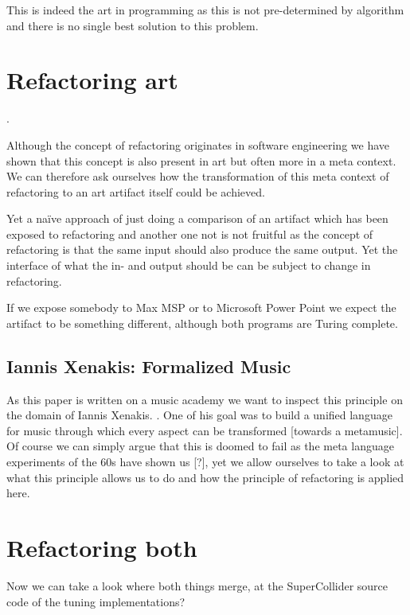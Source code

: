 \documentclass[10pt,twocolumn,letterpaper]{article}
\begin{document}
This is indeed the art in programming as this is not pre-determined by algorithm and there is no
single best solution to this problem.

\section{Refactoring art}

\cite{Schubert_2019}.

Although the concept of refactoring originates in software engineering we have shown that this concept is also
present in art but often more in a meta context.
We can therefore ask ourselves how the transformation of this meta context of refactoring to an art artifact itself
could be achieved.

Yet a naïve approach of just doing a comparison of an artifact which has been exposed to refactoring and another one
not is not fruitful as the concept of refactoring is that the same input should also produce the same output.
Yet the interface of what the in- and output should be can be subject to change in refactoring.

If we expose somebody to Max MSP or to Microsoft Power Point we expect the artifact to be something different, although
both programs are Turing complete.

\subsection{Iannis Xenakis: Formalized Music}

As this paper is written on a music academy we want to inspect this principle on the domain of Iannis Xenakis. \cite{Xenakis_1992}.
One of his goal was to build a unified language for music through which every aspect can be transformed [towards a metamusic].
Of course we can simply argue that this is doomed to fail as the meta language experiments of the 60s have shown us [?], yet we allow ourselves to take a look at what this principle allows us to do and how the principle of refactoring is applied here.


\section{Refactoring both}

Now we can take a look where both things merge, at the SuperCollider source code of the tuning implementations?



\end{document}
